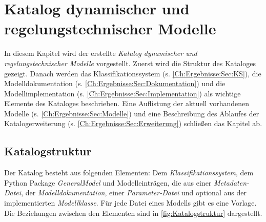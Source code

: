 \chapter{Katalog dynamischer und regelungstechnischer Modelle}
\label{Ch:Ergebnisse}
In diesem Kapitel wird der erstellte \textit{Katalog dynamischer und regelungstechnischer Modelle} vorgestellt. Zuerst wird die Struktur des Kataloges gezeigt. Danach werden das Klassifikationssystem (s. \autoref{Ch:Ergebnisse:Sec:KS}), die Modelldokumentation (s. \autoref{Ch:Ergebnisse:Sec:Dokumentation}) und die Modellimplementation (s. \autoref{Ch:Ergebnisse:Sec:Implementation}) als wichtige Elemente des Kataloges beschrieben. Eine Auflistung der aktuell vorhandenen Modelle (s. \autoref{Ch:Ergebnisse:Sec:Modelle}) und eine Beschreibung des Ablaufes der Katalogerweiterung (s. \autoref{Ch:Ergebnisse:Sec:Erweiterung}) schließen das Kapitel ab.
\section{Katalogstruktur}
\label{Ch:Ergebnisse:Sec:Struktur}
Der Katalog besteht aus folgenden Elementen: Dem \textit{Klassifikationssystem}, dem Python Package \textit{GeneralModel} und Modelleinträgen, die aus einer \textit{Metadaten-Datei}, der \textit{Modelldokumentation}, einer \textit{Parameter-Datei} und optional aus der implementierten \textit{Modellklasse}. Für jede Datei eines Modells gibt es eine Vorlage. Die Beziehungen zwischen den Elementen sind in \autoref{fig:Katalogstruktur} dargestellt.

